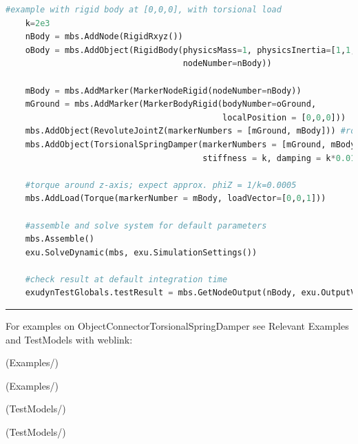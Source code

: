 \begin{lstlisting}[language=Python, firstnumber=1]
    #example with rigid body at [0,0,0], with torsional load
    k=2e3
    nBody = mbs.AddNode(RigidRxyz())
    oBody = mbs.AddObject(RigidBody(physicsMass=1, physicsInertia=[1,1,1,0,0,0], 
                                    nodeNumber=nBody))
    
    mBody = mbs.AddMarker(MarkerNodeRigid(nodeNumber=nBody))
    mGround = mbs.AddMarker(MarkerBodyRigid(bodyNumber=oGround, 
                                            localPosition = [0,0,0]))
    mbs.AddObject(RevoluteJointZ(markerNumbers = [mGround, mBody])) #rotation around ground Z-axis
    mbs.AddObject(TorsionalSpringDamper(markerNumbers = [mGround, mBody], 
                                        stiffness = k, damping = k*0.01, offset = 0))

    #torque around z-axis; expect approx. phiZ = 1/k=0.0005
    mbs.AddLoad(Torque(markerNumber = mBody, loadVector=[0,0,1])) 

    #assemble and solve system for default parameters
    mbs.Assemble()
    exu.SolveDynamic(mbs, exu.SimulationSettings())
    
    #check result at default integration time
    exudynTestGlobals.testResult = mbs.GetNodeOutput(nBody, exu.OutputVariableType.Rotation)[2]

\end{lstlisting}

\vspace{6pt}\par\noindent\rule{\textwidth}{0.4pt}
%
\noindent For examples on ObjectConnectorTorsionalSpringDamper see Relevant Examples and TestModels with weblink:
\bi
\item {} (Examples/)
\item {} (Examples/)
\item {} (TestModels/)
\item {} (TestModels/)

\ei

